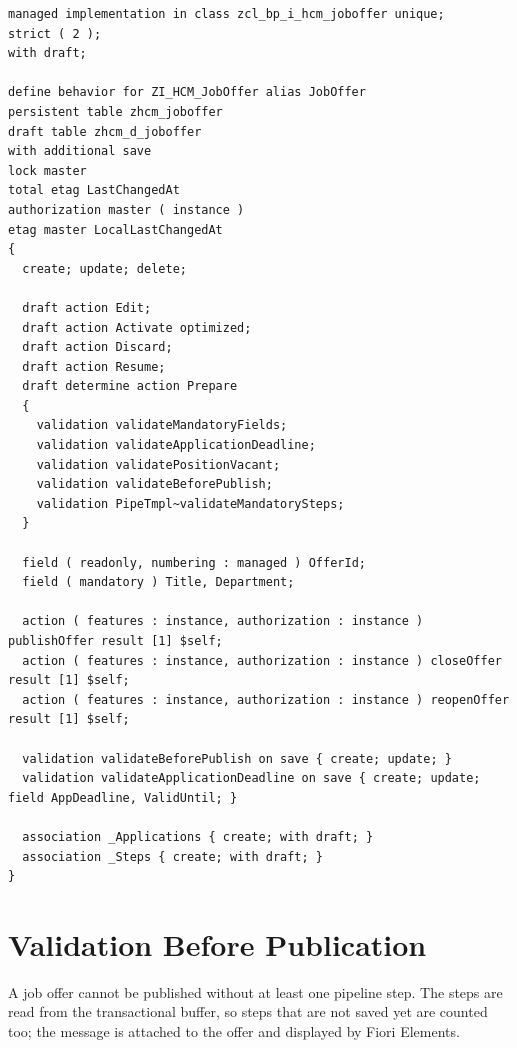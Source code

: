 \begin{lstlisting}[language=ABAPRAP, caption={Behavior definition of the job offer (excerpt)}, label={lst:bdef_joboffer}]
managed implementation in class zcl_bp_i_hcm_joboffer unique;
strict ( 2 );
with draft;

define behavior for ZI_HCM_JobOffer alias JobOffer
persistent table zhcm_joboffer
draft table zhcm_d_joboffer
with additional save
lock master
total etag LastChangedAt
authorization master ( instance )
etag master LocalLastChangedAt
{
  create; update; delete;

  draft action Edit;
  draft action Activate optimized;
  draft action Discard;
  draft action Resume;
  draft determine action Prepare
  {
    validation validateMandatoryFields;
    validation validateApplicationDeadline;
    validation validatePositionVacant;
    validation validateBeforePublish;
    validation PipeTmpl~validateMandatorySteps;
  }

  field ( readonly, numbering : managed ) OfferId;
  field ( mandatory ) Title, Department;

  action ( features : instance, authorization : instance ) publishOffer result [1] $self;
  action ( features : instance, authorization : instance ) closeOffer result [1] $self;
  action ( features : instance, authorization : instance ) reopenOffer result [1] $self;

  validation validateBeforePublish on save { create; update; }
  validation validateApplicationDeadline on save { create; update; field AppDeadline, ValidUntil; }

  association _Applications { create; with draft; }
  association _Steps { create; with draft; }
}
\end{lstlisting}

\section{Validation Before Publication}

A job offer cannot be published without at least one pipeline step. The steps are read from the transactional buffer, so steps that are not saved yet are counted too; the message is attached to the offer and displayed by Fiori Elements.


